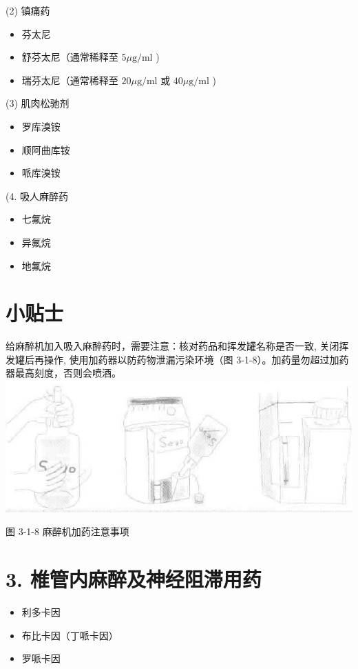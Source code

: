 \documentclass[10pt]{article}
\begin{document}
(2) 镇痛药

\begin{itemize}
  \item 芬太尼
  \item 舒芬太尼（通常稀释至 $5 \mu \mathrm{g} / \mathrm{ml}$ )
  \item 瑞芬太尼（通常稀释至 $20 \mu \mathrm{g} / \mathrm{ml}$ 或 $40 \mu \mathrm{g} / \mathrm{ml}$ )
\end{itemize}

(3) 肌肉松驰剂

\begin{itemize}
  \item 罗库溴铵
  \item 顺阿曲库铵
  \item 哌库溴铵
\end{itemize}

(4. 吸人麻醉药

\begin{itemize}
  \item 七氟烷
  \item 异氟烷
  \item 地氟烷
\end{itemize}

\section*{小贴士}
给麻醉机加入吸入麻醉药时，需要注意：核对药品和挥发罐名称是否一致, 关闭挥发罐后再操作, 使用加药器以防药物泄漏污染环境（图 3-1-8）。加药量勿超过加药器最高刻度，否则会喷酒。\\
\includegraphics[max width=\textwidth, center]{2024_07_05_645bb794a4d4f32ee0c8g-076}

图 3-1-8 麻醉机加药注意事项

\section*{3. 椎管内麻醉及神经阻滞用药}
\begin{itemize}
  \item 利多卡因
  \item 布比卡因（丁哌卡因）
  \item 罗哌卡因
\end{itemize}
\end{document}
